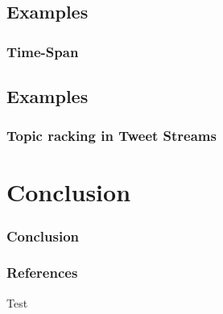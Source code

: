 \documentclass{beamer}
\begin{document}
\subsection{Examples}
\begin{frame}
\frametitle{Time-Span}
\end{frame}

\subsection{Examples}
\begin{frame}
\frametitle{Topic racking in Tweet Streams}
\end{frame}

\section{Conclusion}
\begin{frame}
\frametitle{Conclusion}
\end{frame}

\begin{frame}
\frametitle{References}
Test\cite{library7291}


\end{frame}
\end{document}
